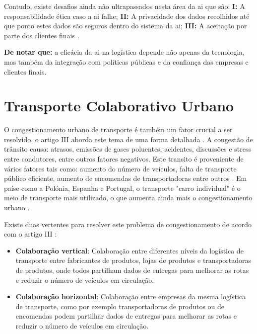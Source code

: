 Contudo, existe desafios ainda não ultrapassados nesta área da \gls{ai} que são: \textbf{I:} A responsabilidade ética caso a \gls{ai} falhe; \textbf{II:} A privacidade dos dados recolhidos até que ponto estes dados são seguros dentro do sistema da \gls{ai}; \textbf{III:} A aceitação por parte dos clientes finais \cite{su162411265}.

\textbf{De notar que:} a eficácia da \gls{ai} na logística depende não apenas da tecnologia, mas também da integração com políticas públicas e da confiança das empresas e clientes finais.
\section{Transporte Colaborativo Urbano}
\label{sec:transporte_colaborativo_urbano}

O congestionamento urbano de transporte é também um fator crucial a ser resolvido, o artigo III  aborda este tema de uma forma detalhada \cite{CLEOPHAS2019801}.
A congestão de trânsito causa: atrasos, emissões de gases poluentes, acidentes, discussões e stress entre condutores, entre outros fatores negativos.
Este transito é proveniente de vários fatores tais como: aumento do número de veículos, falta de transporte público eficiente, aumento de encomendas de transportadoras entre outros \cite{CLEOPHAS2019801}.
Em paíse como a Polónia, Espanha e Portugal, o transporte "carro individual" é o meio de transporte mais utilizado, o que aumenta ainda mais o congestionamento urbano \cite{en15114103, NAVARRO2016314, Correia02062024}.

Existe duas vertentes para resolver este problema de congestionamento de acordo com o artigo III \cite{CLEOPHAS2019801}:
\begin{itemize}
    \item \textbf{Colaboração vertical}: Colaboração entre diferentes níveis da logística de transporte entre fabricantes de produtos, lojas de produtos e transportadoras de produtos, onde todos partilham dados de entregas para melhorar as rotas e reduzir o número de veículos em circulação.
    \item \textbf{Colaboração horizontal}: Colaboração entre empresas da mesma logística de transporte, como por exemplo transportadoras de produtos ou de encomendas podem partilhar dados de entregas para melhorar as rotas e reduzir o número de veículos em circulação.
\end{itemize}

